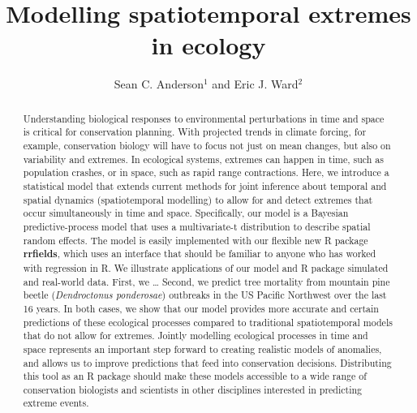\documentclass[12pt,english]{article}
\title{Modelling spatiotemporal extremes in ecology}
\author{
Sean C. Anderson$^1$ and
Eric J. Ward$^2$
}
\date{}
\begin{document}
\maketitle

\begin{spacing}{1.25}


\begin{abstract}

Understanding biological responses to environmental perturbations in time and
space is critical for conservation planning. With projected trends in climate
forcing, for example, conservation biology will have to focus not just on mean
changes, but also on variability and extremes. In ecological systems, extremes
can happen in time, such as population crashes, or in space, such as rapid
range contractions. Here, we introduce a statistical model that extends current
methods for joint inference about temporal and spatial dynamics (spatiotemporal
modelling) to allow for and detect extremes that occur simultaneously in time
and space. Specifically, our model is a Bayesian predictive-process model that
uses a multivariate-t distribution to describe spatial random effects. The
model is easily implemented with our flexible new R package \textbf{rrfields},
which uses an interface that should be familiar to anyone who has worked with
regression in R. We illustrate applications of our model and R package simulated and
real-world data. First, we \ldots
Second, we predict tree mortality from mountain pine beetle (\emph{Dendroctonus
  ponderosae}) outbreaks in the US Pacific Northwest over the last 16 years. In
both cases, we show that our model provides more accurate and certain
predictions of these ecological processes compared to traditional
spatiotemporal models that do not allow for extremes. Jointly modelling
ecological processes in time and space represents an important step forward to
creating realistic models of anomalies, and allows us to improve predictions
that feed into conservation decisions. Distributing this tool as an R package
should make these models accessible to a wide range of conservation biologists
and scientists in other disciplines interested in predicting extreme events.
\end{abstract}


\end{spacing}
\end{document}
